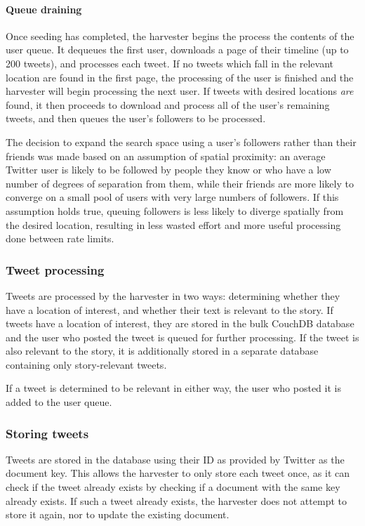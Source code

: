 \paragraph{Queue draining}
Once seeding has completed, the harvester begins the process the contents of the user queue. It dequeues the first user, downloads a page of their timeline (up to 200 tweets), and processes each tweet. If no tweets which fall in the relevant location are found in the first page, the processing of the user is finished and the harvester will begin processing the next user. If tweets with desired locations \textit{are} found, it then proceeds to download and process all of the user's remaining tweets, and then queues the user's followers to be processed.

The decision to expand the search space using a user's followers rather than their friends was made based on an assumption of spatial proximity: an average Twitter user is likely to be followed by people they know or who have a low number of degrees of separation from them, while their friends are more likely to converge on a small pool of users with very large numbers of followers. If this assumption holds true, queuing followers is less likely to diverge spatially from the desired location, resulting in less wasted effort and more useful processing done between rate limits.

\subsubsection{Tweet processing}

Tweets are processed by the harvester in two ways: determining whether they have a location of interest, and whether their text is relevant to the story. If tweets have a location of interest, they are stored in the bulk CouchDB database and the user who posted the tweet is queued for further processing. If the tweet is also relevant to the story, it is additionally stored in a separate database containing only story-relevant tweets.

If a tweet is determined to be relevant in either way, the user who posted it is added to the user queue.

\subsubsection{Storing tweets}

Tweets are stored in the database using their ID as provided by Twitter as the document key. This allows the harvester to only store each tweet once, as it can check if the tweet already exists by checking if a document with the same key already exists. If such a tweet already exists, the harvester does not attempt to store it again, nor to update the existing document.

